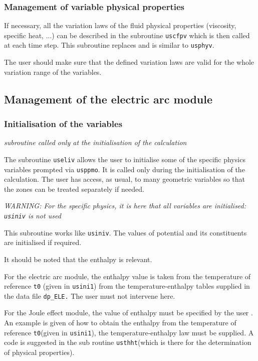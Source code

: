 {{{%
\subsubsection{Management of variable physical properties}

If necessary, all the variation laws of the fluid physical properties
(viscosity, specific heat, ...) can be described in the subroutine \texttt{uscfpv}
 which is then called at each time step. This subroutine replaces and is similar to \texttt{usphyv}.

The user should make sure that the defined variation laws are valid for
the whole variation range of the variables.

\subsection{Management of the electric arc module}
\subsubsection{Initialisation of the variables}

\noindent
\textit{subroutine called only at the initialisation of the calculation}

The subroutine \texttt{useliv} allows the user to initialise some of the specific
 physics variables
 prompted via \texttt{usppmo}. It is called only during the initialisation of
 the calculation. The user has access, as usual, to many geometric variables so
 that the zones can be treated separately if needed.

{\em WARNING: For the specific physics, it is here that all variables are initialised:
 \texttt{usiniv} is not used}

This subroutine works like \texttt{usiniv}. The values of potential and its
constituents are initialised if required.

It should be noted that the enthalpy is relevant.

\begin{list}{-}{}
\item For the electric arc module, the enthalpy value is taken from the temperature
 of reference \texttt{t0} (given in \texttt{usini1}) from the temperature-enthalpy
 tables
 supplied in the data file \texttt{dp\_ELE.} The user must not intervene here.
\item For the Joule effect module, the value of enthalpy must be specified by the user
. An example is given of how to obtain the enthalpy from the temperature of reference
 \texttt{t0}(given in \texttt{usini1}), the temperature-enthalpy law must be
supplied. A code is suggested in the sub routine \texttt{usthht}(which is there for
 the determination of physical properties).
\end{list}

}}}
